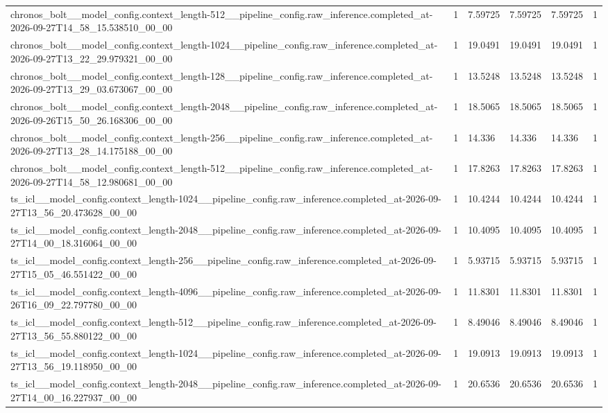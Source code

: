 \begin{tabular}{llllll}
chronos\_bolt\_\_model\_config.context\_length-512\_\_pipeline\_config.raw\_inference.completed\_at-2026-09-27T14\_58\_15.538510\_00\_00 & 1 & 7.59725 & 7.59725 & 7.59725 & 1 \\
chronos\_bolt\_\_model\_config.context\_length-1024\_\_pipeline\_config.raw\_inference.completed\_at-2026-09-27T13\_22\_29.979321\_00\_00 & 1 & 19.0491 & 19.0491 & 19.0491 & 1 \\
chronos\_bolt\_\_model\_config.context\_length-128\_\_pipeline\_config.raw\_inference.completed\_at-2026-09-27T13\_29\_03.673067\_00\_00 & 1 & 13.5248 & 13.5248 & 13.5248 & 1 \\
chronos\_bolt\_\_model\_config.context\_length-2048\_\_pipeline\_config.raw\_inference.completed\_at-2026-09-26T15\_50\_26.168306\_00\_00 & 1 & 18.5065 & 18.5065 & 18.5065 & 1 \\
chronos\_bolt\_\_model\_config.context\_length-256\_\_pipeline\_config.raw\_inference.completed\_at-2026-09-27T13\_28\_14.175188\_00\_00 & 1 & 14.336 & 14.336 & 14.336 & 1 \\
chronos\_bolt\_\_model\_config.context\_length-512\_\_pipeline\_config.raw\_inference.completed\_at-2026-09-27T14\_58\_12.980681\_00\_00 & 1 & 17.8263 & 17.8263 & 17.8263 & 1 \\
ts\_icl\_\_model\_config.context\_length-1024\_\_pipeline\_config.raw\_inference.completed\_at-2026-09-27T13\_56\_20.473628\_00\_00 & 1 & 10.4244 & 10.4244 & 10.4244 & 1 \\
ts\_icl\_\_model\_config.context\_length-2048\_\_pipeline\_config.raw\_inference.completed\_at-2026-09-27T14\_00\_18.316064\_00\_00 & 1 & 10.4095 & 10.4095 & 10.4095 & 1 \\
ts\_icl\_\_model\_config.context\_length-256\_\_pipeline\_config.raw\_inference.completed\_at-2026-09-27T15\_05\_46.551422\_00\_00 & 1 & 5.93715 & 5.93715 & 5.93715 & 1 \\
ts\_icl\_\_model\_config.context\_length-4096\_\_pipeline\_config.raw\_inference.completed\_at-2026-09-26T16\_09\_22.797780\_00\_00 & 1 & 11.8301 & 11.8301 & 11.8301 & 1 \\
ts\_icl\_\_model\_config.context\_length-512\_\_pipeline\_config.raw\_inference.completed\_at-2026-09-27T13\_56\_55.880122\_00\_00 & 1 & 8.49046 & 8.49046 & 8.49046 & 1 \\
ts\_icl\_\_model\_config.context\_length-1024\_\_pipeline\_config.raw\_inference.completed\_at-2026-09-27T13\_56\_19.118950\_00\_00 & 1 & 19.0913 & 19.0913 & 19.0913 & 1 \\
ts\_icl\_\_model\_config.context\_length-2048\_\_pipeline\_config.raw\_inference.completed\_at-2026-09-27T14\_00\_16.227937\_00\_00 & 1 & 20.6536 & 20.6536 & 20.6536 & 1 \\

\end{tabular}
